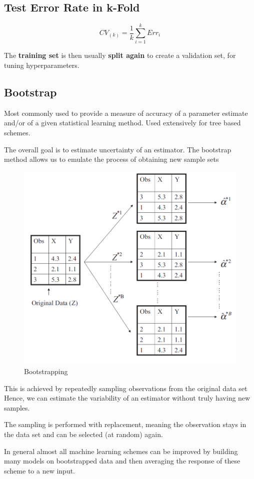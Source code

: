 \documentclass[../Main.tex]{subfiles}
\begin{document}
\subsection{Test Error Rate in k-Fold}
\begin{equation}
    CV_{(k)} = \frac{1}{k} \sum_{i=1}^{k} Err_i
\end{equation}

The \textbf{training set} is then usually \textbf{split again} to create a 
validation set, for tuning hyperparameters.

\subsection{Bootstrap}
Most commonly used to provide a measure 
of accuracy of a parameter estimate and/or 
of a given statistical learning method.
Used extensively for tree based schemes.


The overall goal is to estimate uncertainty of an estimator.
The bootstrap method allows us to 
emulate the process of obtaining 
new sample sets

\begin{figure}[H]
    \centering
    \includegraphics[width=0.5\linewidth]{Images/bootstrapping.png}
    \caption{Bootstrapping}
\end{figure}

This is achieved by repeatedly sampling 
observations from the original data set
Hence, we can estimate the variability of 
an estimator without truly having new 
samples.


The sampling is performed with 
replacement, meaning the observation 
stays in the data set and can be selected (at 
random) again.

In general almost all machine 
learning schemes can be improved by 
building many models on 
bootstrapped data and then 
averaging the response of these 
scheme to a new input.
\end{document}
